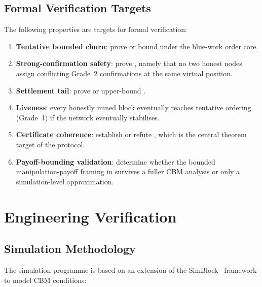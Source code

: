 \documentclass[11pt]{article}
\theoremstyle{definition}
\theoremstyle{plain}
\theoremstyle{remark}
\begin{document}
\subsection{Formal Verification Targets}

The following properties are targets for formal verification:

\begin{enumerate}[nosep]
    \item \textbf{Tentative bounded churn}: prove or bound
     under the blue-work order core.
    \item \textbf{Strong-confirmation safety}: prove
    , namely that no two honest nodes assign conflicting
    Grade~2 confirmations at the same virtual position.
    \item \textbf{Settlement tail}: prove or upper-bound
    .
    \item \textbf{Liveness}: every honestly mined block eventually reaches
    tentative ordering (Grade~1) if the network eventually stabilises.
    \item \textbf{Certificate coherence}: establish or refute
    , which is the central theorem target of the protocol.
    \item \textbf{Payoff-bounding validation}: determine whether the bounded
    manipulation-payoff framing in  survives a fuller CBM
    analysis or only a simulation-level approximation.
\end{enumerate}

\section{Engineering Verification}\label{sec:verification}

\subsection{Simulation Methodology}

The simulation programme is based on an extension of the
SimBlock~\cite{aoki2019simblock} framework to model
CBM conditions:
\end{document}
